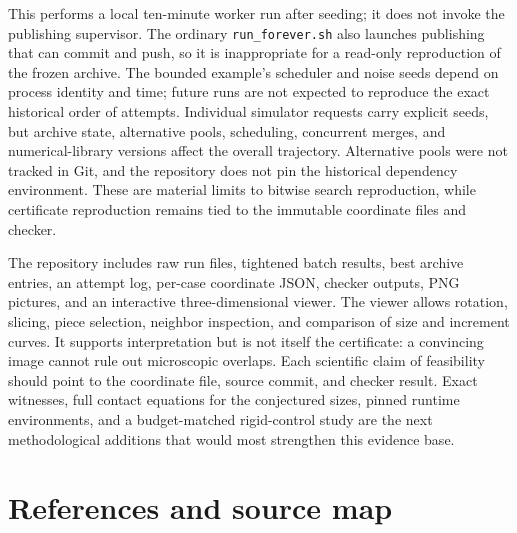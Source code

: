 \documentclass[11pt,a4paper]{article}
\begin{document}
This performs a local ten-minute worker run after seeding; it does not invoke the publishing supervisor. The ordinary \nolinkurl{run_forever.sh} also launches publishing that can commit and push, so it is inappropriate for a read-only reproduction of the frozen archive. The bounded example's scheduler and noise seeds depend on process identity and time; future runs are not expected to reproduce the exact historical order of attempts. Individual simulator requests carry explicit seeds, but archive state, alternative pools, scheduling, concurrent merges, and numerical-library versions affect the overall trajectory. Alternative pools were not tracked in Git, and the repository does not pin the historical dependency environment. These are material limits to bitwise search reproduction, while certificate reproduction remains tied to the immutable coordinate files and checker.

The repository includes raw run files, tightened batch results, best archive entries, an attempt log, per-case coordinate JSON, checker outputs, PNG pictures, and an interactive three-dimensional viewer. The viewer allows rotation, slicing, piece selection, neighbor inspection, and comparison of size and increment curves. It supports interpretation but is not itself the certificate: a convincing image cannot rule out microscopic overlaps. Each scientific claim of feasibility should point to the coordinate file, source commit, and checker result. Exact witnesses, full contact equations for the conjectured sizes, pinned runtime environments, and a budget-matched rigid-control study are the next methodological additions that would most strengthen this evidence base.

\section*{References and source map}
\end{document}
